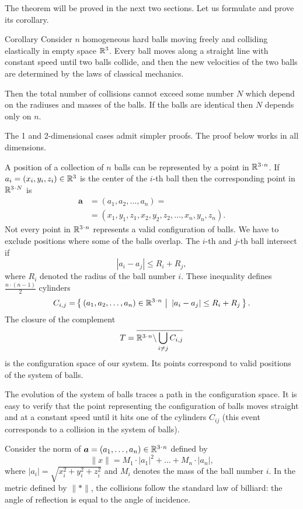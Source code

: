 The theorem will be proved in the next two sections.
Let us formulate and prove its corollary.

\begin{thm}{Corollary}\label{cor:balls}
Consider $n$ homogeneous hard balls
moving freely and colliding
elastically in empty space $\mathbb{R}^3$. 
Every ball moves
along a straight line with constant speed until two balls collide, and then
the new velocities of the two balls are determined by the
laws of classical mechanics.

Then the total number of collisions cannot exceed some number $N$ which depend on the radiuses and masses of the balls.
If the balls are identical then $N$ depends only on $n$.
\end{thm}

The 1 and 2-dimensional cases admit simpler proofs.
The proof below works in all dimensions.



A position of a collection of $n$ balls can be represented by a point in $\RR^{3\cdot n}$.
If $a_i=(x_i,y_i,z_i) \in \RR^3$ is the center of the $i$-th ball
then
the corresponding point in $\RR^{3\cdot N}$ is
\begin{align*}
\bm{a}&=(a_1, a_2 , \dots , a_n ) =
\\
&=(x_1, y_1 , z_1 , x_2 , y_2 , z_2 , \dots , x_n , y_n , z_n).
\end{align*}
Not every point in $\RR^{3\cdot n}$ represents a valid configuration of balls. 
We have to exclude positions where some of the balls overlap. 
The $i$-th and $j$-th ball intersect if 
$$|a_i - a_j | \le R_i+R_j,$$
where $R_i$ denoted the radius of the ball number $i$.
These inequality defines $\tfrac{n\cdot(n-1)}{2}$ cylinders 
\[C_{i,j}=\set{(a_1, a_2 , \dots , a_n )\in\RR^{3\cdot n}} {|a_i - a_j | \le R_i+R_j}.\] 
The closure of the complement
\[T=\overline{\RR^{3\cdot n}\backslash \bigcup_{i\ne j} C_{i,j}}\] 
is the configuration space of our system. 
Its points correspond
to valid positions of the system of balls.

The evolution of the system
of balls traces a path in the configuration space. 
It is easy to verify that
the point representing the configuration of balls moves straight and at a
constant speed until it hits one of the cylinders $C_{ij}$ (this event corresponds
to a collision in the system of balls).

Consider the norm of $\bm{a}=(a_1,\dots,a_n)\in \RR^{3\cdot n}$ defined by
\[\lVert x\rVert=M_1\cdot|a_1|^2+\dots+M_n\cdot |a_n|,\]
where $|a_i|=\sqrt{x_i^2+y_i^2+z_i^2}$ 
and $M_i$ denotes the mass of the ball number $i$.
In the metric defined by $\lVert {*}\rVert$,
the collisions follow the
standard law of billiard: 
the angle of reflection is equal to the angle
of incidence. 

